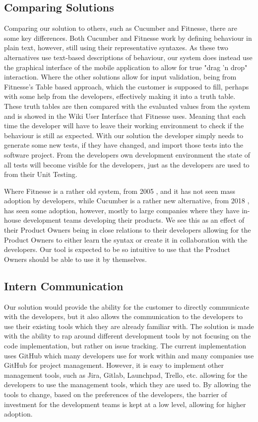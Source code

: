 \subsection{Comparing Solutions}

Comparing our solution to others, such as Cucumber and Fitnesse, there are some key differences.
Both Cucumber and Fitnesse work by defining behaviour in plain text, however, still using their representative syntaxes.
As these two alternatives use text-based descriptions of behaviour, our system does instead use the graphical interface of the mobile application to allow for true "drag 'n drop" interaction.
Where the other solutions allow for input validation, being from Fitnesse's Table based approach, which the customer is supposed to fill, perhaps with some help from the developers, effectively making it into a truth table.
These truth tables are then compared with the evaluated values from the system and is showed in the Wiki User Interface that Fitnesse uses.
Meaning that each time the developer will have to leave their working environment to check if the behaviour is still as expected.
With our solution the developer simply needs to generate some new tests, if they have changed, and import those tests into the software project.
From the developers own development environment the state of all tests will become visible for the developers, just as the developers are used to from their Unit Testing.

Where Fitnesse is a rather old system, from 2005 \cite{FitnesseDownload}, and it has not seen mass adoption by developers, while Cucumber is a rather new alternative, from 2018 \cite{CucumberWiki}, has seen some adoption, however, mostly to large companies where they have in-house development teams developing their products.
We see this as an effect of their Product Owners being in close relations to their developers allowing for the Product Owners to either learn the syntax or create it in collaboration with the developers.
Our tool is expected to be so intuitive to use that the Product Owners should be able to use it by themselves.

\subsection{Intern Communication}

Our solution would provide the ability for the customer to directly communicate with the developers, but it also allows the communication to the developers to use their existing tools which they are already familiar with.
The solution is made with the ability to rap around different development tools by not focusing on the code implementation, but rather on issue tracking.
The current implementation uses GitHub which many developers use for work within and many companies use GitHub for project management.
However, it is easy to implement other management tools, such as Jira, Gitlab, Launchpad, Trello, etc. allowing for the developers to use the management tools, which they are used to.
By allowing the tools to change, based on the preferences of the developers, the barrier of investment for the development teams is kept at a low level, allowing for higher adoption.

